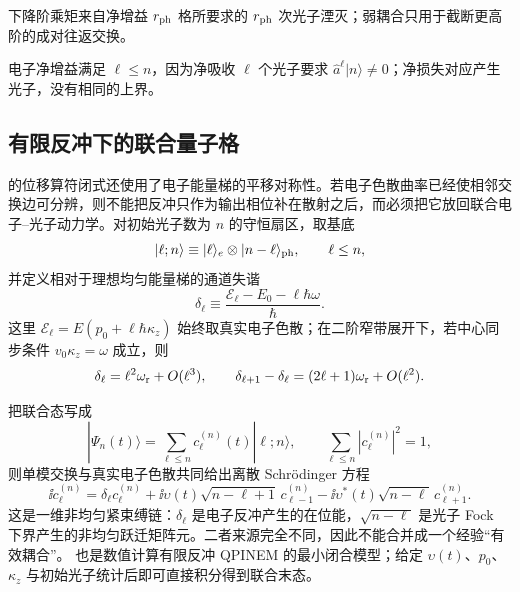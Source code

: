 



下降阶乘矩来自净增益 $r_{\rm ph}$ 格所要求的 $r_{\rm ph}$ 次光子湮灭；弱耦合只用于截断更高阶的成对往返交换。

电子净增益满足 $\ell\le n$，因为净吸收 $\ell$ 个光子要求 $\hat a^\ell|n\rangle\neq0$；净损失对应产生光子，没有相同的上界。






\subsection{有限反冲下的联合量子格}\label{subsec:qpinem-finite-recoil-lattice-dp46}

 的位移算符闭式还使用了电子能量梯的平移对称性。若电子色散曲率已经使相邻交换边可分辨，则不能把反冲只作为输出相位补在散射之后，而必须把它放回联合电子--光子动力学。对初始光子数为 $n$ 的守恒扇区，取基底
\begin{equation*}
 |\ell;n\rangle\equiv|\ell\rangle_e\otimes|n-\ell\rangle_{\rm ph},
 \qquad \ell\le n,
\end{equation*}
并定义相对于理想均匀能量梯的通道失谐
\begin{equation}
\boxed{
 \delta_\ell
 \equiv\frac{\mathcal E_\ell-E_0-\ell\hbar\omega}{\hbar}.}
\label{eq:qpinem_recoil_channel_detuning_dp46}
\end{equation}
这里 $\mathcal E_\ell=E(p_0+\ell\hbar \kappa_z)$ 始终取真实电子色散；在二阶窄带展开下，若中心同步条件 $v_0\kappa_z=\omega$ 成立，则
\begin{equation}
 \delta_\ell=\ell^2\omega_{\rm r}+O(\ell^3),
 \qquad
 \delta_{\ell+1}-\delta_\ell=(2\ell+1)\omega_{\rm r}+O(\ell^2).
\label{eq:qpinem_recoil_detuning_quadratic_dp46}
\end{equation}

把联合态写成
\begin{equation*}
 |\Psi_n(t)\rangle=\sum_{\ell\le n}c_\ell^{(n)}(t)|\ell;n\rangle,
 \qquad
 \sum_{\ell\le n}|c_\ell^{(n)}|^2=1,
\end{equation*}
则单模交换与真实电子色散共同给出离散 Schr\"odinger 方程
\begin{equation}
\boxed{
 \ii\dot c_\ell^{(n)}
 =\delta_\ell c_\ell^{(n)}
 +\ii\upsilon(t)\sqrt{n-\ell+1}\,c_{\ell-1}^{(n)}
 -\ii\upsilon^*(t)\sqrt{n-\ell}\,c_{\ell+1}^{(n)}.}
\label{eq:qpinem_finite_recoil_coupled_lattice_dp46}
\end{equation}
这是一维非均匀紧束缚链：$\delta_\ell$ 是电子反冲产生的在位能，$\sqrt{n-\ell}$ 是光子 Fock 下界产生的非均匀跃迁矩阵元。二者来源完全不同，因此不能合并成一个经验“有效耦合”。 也是数值计算有限反冲 QPINEM 的最小闭合模型；给定 $\upsilon(t)$、$p_0$、$\kappa_z$ 与初始光子统计后即可直接积分得到联合末态。

